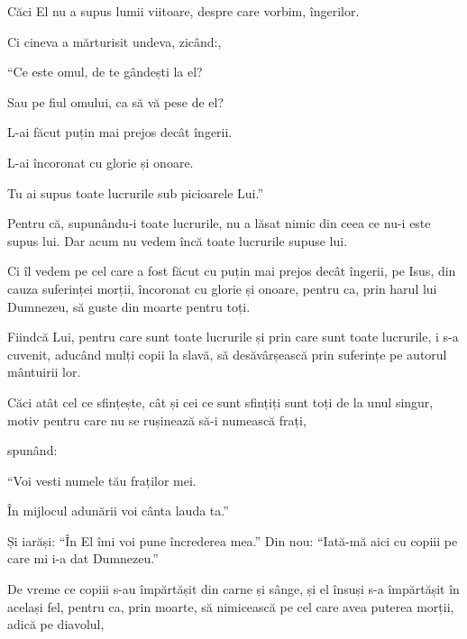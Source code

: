{\par }{\PP {}Căci El nu a supus lumii viitoare, despre care vorbim, îngerilor.

Ci cineva a mărturisit undeva, zicând:,

\par }{\Q “Ce este omul, de te gândești la el?

\par }{\QB Sau pe fiul omului, ca să vă pese de el?


\par }{\Q {}L-ai făcut puțin mai prejos decât îngerii.

\par }{\QB L-ai încoronat cu glorie și onoare.


\par }{\QB {}Tu ai supus toate lucrurile sub picioarele Lui.”

\par }{\PP Pentru că, supunându-i toate lucrurile, nu a lăsat nimic din ceea ce nu-i este supus lui. Dar acum nu vedem încă toate lucrurile supuse lui.

Ci îl vedem pe cel care a fost făcut cu puțin mai prejos decât îngerii, pe Isus, din cauza suferinței morții, încoronat cu glorie și onoare, pentru ca, prin harul lui Dumnezeu, să guste din moarte pentru toți.


\par }{\PP {}Fiindcă Lui, pentru care sunt toate lucrurile și prin care sunt toate lucrurile, i s-a cuvenit, aducând mulți copii la slavă, să desăvârșească prin suferințe pe autorul mântuirii lor.

Căci atât cel ce sfințește, cât și cei ce sunt sfințiți sunt toți de la unul singur, motiv pentru care nu se rușinează să-i numească frați,

spunând:

\par }{\Q “Voi vesti numele tău fraților mei.

\par }{\QB În mijlocul adunării voi cânta lauda ta.”


\par }{\PP {}Și iarăși: “În El îmi voi pune încrederea mea.” Din nou: “Iată-mă aici cu copiii pe care mi i-a dat Dumnezeu.”

De vreme ce copiii s-au împărtășit din carne și sânge, și el însuși s-a împărtășit în același fel, pentru ca, prin moarte, să nimicească pe cel care avea puterea morții, adică pe diavolul,

}
